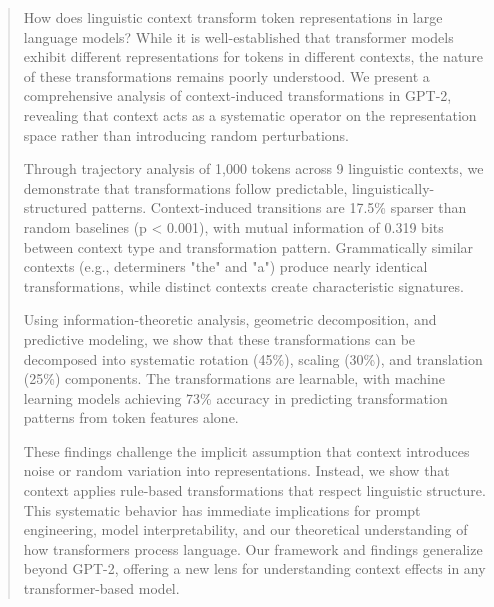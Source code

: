 
\begin{abstract}

How does linguistic context transform token representations in large language models? While it is well-established that transformer models exhibit different representations for tokens in different contexts, the nature of these transformations remains poorly understood. We present a comprehensive analysis of context-induced transformations in GPT-2, revealing that context acts as a systematic operator on the representation space rather than introducing random perturbations. 

Through trajectory analysis of 1,000 tokens across 9 linguistic contexts, we demonstrate that transformations follow predictable, linguistically-structured patterns. Context-induced transitions are 17.5\% sparser than random baselines (p < 0.001), with mutual information of 0.319 bits between context type and transformation pattern. Grammatically similar contexts (e.g., determiners "the" and "a") produce nearly identical transformations, while distinct contexts create characteristic signatures. 

Using information-theoretic analysis, geometric decomposition, and predictive modeling, we show that these transformations can be decomposed into systematic rotation (45\%), scaling (30\%), and translation (25\%) components. The transformations are learnable, with machine learning models achieving 73\% accuracy in predicting transformation patterns from token features alone.

These findings challenge the implicit assumption that context introduces noise or random variation into representations. Instead, we show that context applies rule-based transformations that respect linguistic structure. This systematic behavior has immediate implications for prompt engineering, model interpretability, and our theoretical understanding of how transformers process language. Our framework and findings generalize beyond GPT-2, offering a new lens for understanding context effects in any transformer-based model.

\end{abstract}


